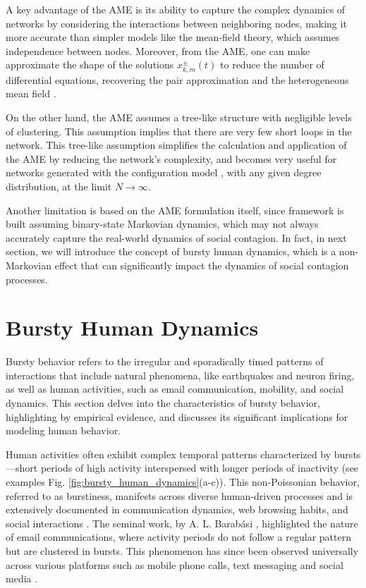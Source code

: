 A key advantage of the AME is its ability to capture the complex dynamics of networks by considering the interactions between neighboring nodes, making it more accurate than simpler models like the mean-field theory, which assumes independence between nodes. Moreover, from the AME, one can make approximate the shape of the solutions $x^{\pm}_{k,m} (t)$ to reduce the number of differential equations, recovering the pair approximation and the heterogeneous mean field \cite{gleeson-2013}.

On the other hand, the AME assumes a tree-like structure with negligible levels of clustering. This assumption implies that there are very few short loops in the network. This tree-like assumption simplifies the calculation and application of the AME by reducing the network's complexity, and becomes very useful for networks generated with the configuration model \cite{newman-book}, with any given degree distribution, at the limit $N \to \infty$.

Another limitation is based on the AME formulation itself, since framework is built assuming binary-state Markovian dynamics, which may not always accurately capture the real-world dynamics of social contagion. In fact, in next section, we will introduce the concept of bursty human dynamics, which is a non-Markovian effect that can significantly impact the dynamics of social contagion processes.

\section{\label{sec: Bursty Human Dynamics} Bursty Human Dynamics}

Bursty behavior refers to the irregular and sporadically timed patterns of interactions that include natural phenomena, like earthquakes and neuron firing, as well as human activities, such as email communication, mobility, and social dynamics. This section delves into the characteristics of bursty behavior, highlighting by empirical evidence, and discusses its significant implications for modeling human behavior.

Human activities often exhibit complex temporal patterns characterized by bursts---short periods of high activity interspersed with longer periods of inactivity (see examples Fig. \ref{fig:bursty_human_dynamics}(a-c)). This non-Poissonian behavior, referred to as burstiness, manifests across diverse human-driven processes and is extensively documented in communication dynamics, web browsing habits, and social interactions \cite{Barabasi2005Bursts, Vazquez2006Bursts}. The seminal work, by A. L. Barabási \cite{Barabasi2005Bursts}, highlighted the nature of email communications, where activity periods do not follow a regular pattern but are clustered in bursts. This phenomenon has since been observed universally across various platforms such as mobile phone calls, text messaging and social media \cite{karsai-2011, Miritello2013Capacity,moro,artime-2017,rybski-2012,zignani-2016,kumar-2020,iribarren-2009}.

